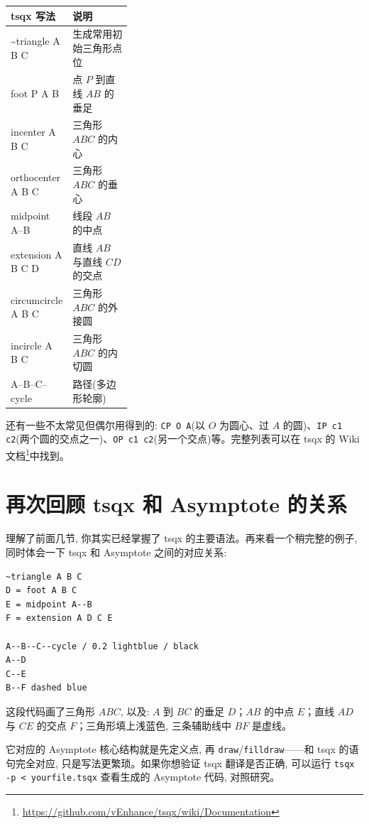 \documentclass[11pt,oneside]{ctexbook}
\begin{document}
\begin{tabularx}{0.94\linewidth}{@{}>{\ttfamily}p{0.34\linewidth}X@{}}
	\toprule
	tsqx 写法                         & 说明                   \\
	\midrule
	\textnormal{\~{}triangle A B C} & 生成常用初始三角形点位          \\
	foot P A B                      & 点 $P$ 到直线 $AB$ 的垂足   \\
	incenter A B C                  & 三角形 $ABC$ 的内心        \\
	orthocenter A B C               & 三角形 $ABC$ 的垂心        \\
	midpoint A--B                   & 线段 $AB$ 的中点          \\
	extension A B C D               & 直线 $AB$ 与直线 $CD$ 的交点 \\
	circumcircle A B C              & 三角形 $ABC$ 的外接圆       \\
	incircle A B C                  & 三角形 $ABC$ 的内切圆       \\
	A--B--C--cycle                  & 路径(多边形轮廓)            \\
	\bottomrule
\end{tabularx}

\vspace{0.5cm}

还有一些不太常见但偶尔用得到的: \texttt{CP O A}(以 $O$ 为圆心、过 $A$ 的圆)、\texttt{IP c1 c2}(两个圆的交点之一)、\texttt{OP c1 c2}(另一个交点)等。完整列表可以在 tsqx 的 Wiki 文档\footnote{\url{https://github.com/vEnhance/tsqx/wiki/Documentation}}中找到。

\section{再次回顾 tsqx 和 Asymptote 的关系}
理解了前面几节, 你其实已经掌握了 tsqx 的主要语法。再来看一个稍完整的例子, 同时体会一下 tsqx 和 Asymptote 之间的对应关系:
\begin{lstlisting}[language={}]
~triangle A B C
D = foot A B C
E = midpoint A--B
F = extension A D C E

A--B--C--cycle / 0.2 lightblue / black
A--D
C--E
B--F dashed blue
\end{lstlisting}

这段代码画了三角形 $ABC$, 以及: $A$ 到 $BC$ 的垂足 $D$；$AB$ 的中点 $E$；直线 $AD$ 与 $CE$ 的交点 $F$；三角形填上浅蓝色, 三条辅助线中 $BF$ 是虚线。

它对应的 Asymptote 核心结构就是先定义点, 再 \texttt{draw}/\texttt{filldraw}——和 tsqx 的语句完全对应, 只是写法更繁琐。如果你想验证 tsqx 翻译是否正确, 可以运行 \texttt{tsqx -p < yourfile.tsqx} 查看生成的 Asymptote 代码, 对照研究。
\end{document}
